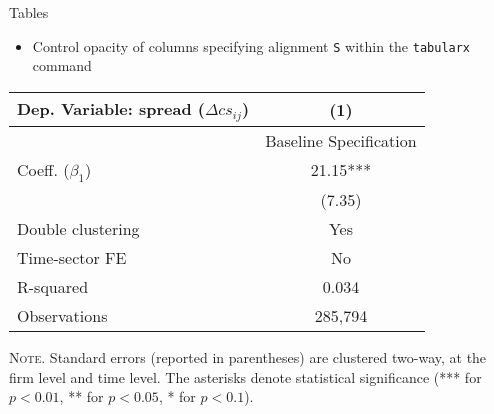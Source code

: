 \documentclass[10pt]{beamer}
\begin{document}

\begin{frame}
	{Tables}
	\begin{itemize}
		\item Control opacity of columns specifying alignment \texttt{S} within the \texttt{tabularx} command 
	\end{itemize}
	\begin{table}[th]
		\centering%
		\begin{minipage}[b]{.5\textwidth}
			\vspace{.2cm}\tablesize
			\begin{tabularx}{\textwidth}{lS}
				\toprule
				Dep. Variable: spread ($\Delta cs_{ij}$) 	& (1)\\
				\midrule
				& {Baseline Specification} \\
				\midrule
				 Coeff. ($\beta_1$) 		&  21.15*** \\
				&   (7.35) \\
				\midrule
				 Double clustering 		& Yes \\
				Time-sector FE 												& No \\
				 R-squared 					& 0.034 \\
				Observations 												& 285,794 \\\bottomrule
			\end{tabularx}\vspace{.2cm}\newline
			\tiny{{\scshape Note.} Standard errors (reported in parentheses) are clustered two-way, at the firm level and time level. The asterisks denote statistical significance (*** for $p<0.01$, ** for $p<0.05$, * for $p<0.1$).\newline}%
			\label{tab:label}%
		\end{minipage}
	\end{table}
\end{frame}

\end{document}
